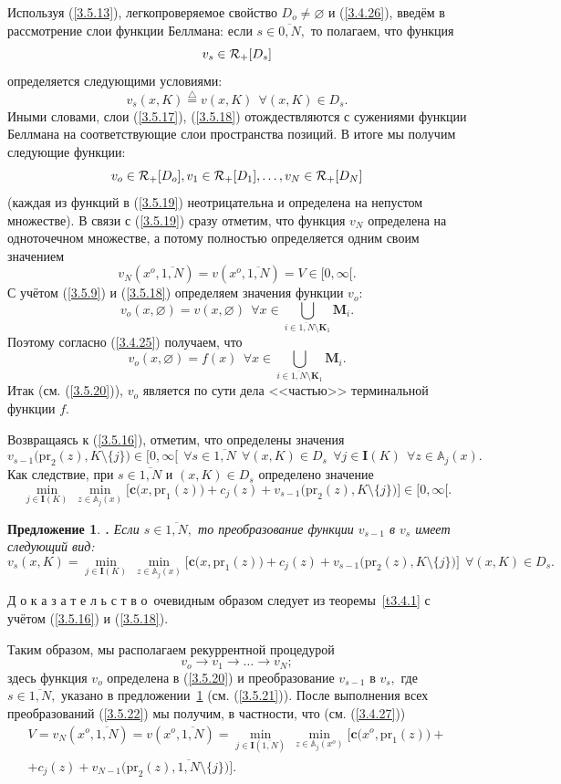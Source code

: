 \documentclass[11pt,twoside]{report}
\newcommand{\bfn}{\begin{equation}}
\newcommand{\efn}{\end{equation}}
\newcommand{\df}{\stackrel{\triangle}{=}}
\newcommand{\ov}{\overline}
\newcounter{theo}
\newcounter{pred}
\newtheorem{pred}{Предложение}[section]
\newcommand{\TL}{\mbox{\bf{$\!\!$.}}}
\newcommand{\sm}{\setminus}
\newcommand{\fa}{\forall}
\newcommand{\clr}{{\cal R}}
\newcommand{\bba}{{\mathbb A}}
\newcommand{\emp}{\varnothing}
\begin{document}
{Используя (\ref{3.5.13}), легкопроверяемое свойство $D_o\neq \emp$ и (\ref{3.4.26}), введём
в рассмотрение слои функции Беллмана: если $s\in \ov{0,N},$ то полагаем, что функция
\bfn\label{3.5.17}v_s\in \clr_+[D_s]
\efn
определяется следующими условиями:
\bfn\label{3.5.18}v_s(x,K) \df v(x,K)\ \ \fa (x,K)\in D_s.
\efn
Иными словами, слои (\ref{3.5.17}), (\ref{3.5.18}) отождествляются с сужениями  функции
Беллмана на соответствующие слои пространства позиций. В итоге мы получим следующие функции:
\bfn\label{3.5.19}v_o\in \clr_+[D_o], v_1\in \clr_+[D_1],\ldots,v_N\in \clr_+[D_N]
\efn
(каждая из функций в (\ref{3.5.19}) неотрицательна и определена на непустом множестве).
В связи с (\ref{3.5.19}) сразу отметим, что функция $v_N$ определена на одноточечном множестве,
а потому полностью определяется одним своим значением
$$
v_N(x^o,\ov{1,N})= v(x^o,\ov{1,N}) = V\in [0,\infty[.
$$
С учётом (\ref{3.5.9}) и (\ref{3.5.18}) определяем значения функции $v_o$:
$$
v_o(x,\emp) = v(x,\emp)\ \ \fa x\in \bigcup\limits_{i\in \ov{1,N}\sm \mathbf{K}_1}\mathbf{M}_i.
$$
Поэтому согласно (\ref{3.4.25}) получаем, что
\bfn\label{3.5.20}v_o(x,\emp) = f(x)\ \ \fa x\in \bigcup\limits_{i\in \ov{1,N}\sm
\mathbf{K}_1}\mathbf{M}_i.
\efn
Итак (см. (\ref{3.5.20})), $v_o$ является  по сути дела <<частью>> терминальной функции $f.$

Возвращаясь к (\ref{3.5.16}), отметим, что определены значения
$$v_{s-1}\bigl(\mathrm{pr}_2(z),K\sm\{j\}\bigl)\in [0,\infty[\ \ \fa s \in \ov{1,N}\ \ \fa
(x,K)\in D_s\ \ \fa j\in \mathbf{I}(K)\ \ \fa z\in \bba_j(x).$$
Как следствие, при $s\in \ov{1,N}$ и $(x,K)\in D_s$ определено значение
$$\min\limits_{j\in\mathbf{I}(K)}\ \min\limits_{z\in \bba_j(x)}\bigl[\mathbf{c}\bigl(x,
\mathrm{pr}_1(z)\bigl) + c_j(z) + v_{s-1}\bigl(\mathrm{pr}_2(z),K\sm\{j\}\bigl)\bigl]\in [0,\infty[.
$$
\begin{pred}\label{p3.5.1}{\TL} Если $s\in \ov{1,N},$ то преобразование функции
$v_{s-1}$ в $v_s$ имеет следующий вид:
\bfn\label{3.5.21}v_s(x,K) = \min\limits_{j\in \mathbf{I}(K)}\ \min\limits_{z\in \bba_j(x)}
\bigl[\mathbf{c}\bigl(x,\mathrm{pr}_1(z)\bigl) + c_j(z) + v_{s-1}\bigl(\mathrm{pr}_2(z),
K\sm\{j\}\bigl)\bigl]\ \ \fa (x,K) \in D_s.
\efn
\end{pred}

Д о к а з а т е л ь с т в о\, очевидным образом следует из теоремы~\ref{t3.4.1} с учётом
(\ref{3.5.16}) и (\ref{3.5.18}).

Таким образом, мы располагаем рекуррентной процедурой
\bfn\label{3.5.22}v_o \longrightarrow v_1 \longrightarrow \ldots \longrightarrow v_N;
\efn
здесь функция $v_o$ определена в (\ref{3.5.20}) и преобразование $v_{s-1}$ в $v_s,$
где $s\in \ov{1,N},$ указано в предложении~\ref{p3.5.1} (см. (\ref{3.5.21})). После
выполнения всех преобразований (\ref{3.5.22}) мы получим, в частности, что (см. (\ref{3.4.27}))
 \begin{eqnarray}
&V = v_N(x^o,\ov{1,N}) = v(x^o,\ov{1,N}) =
\min\limits_{j\in \mathbf{I}(\overline{1,N})}\
\min\limits_{z\in \bba_j(x^o)} \bigl[\mathbf{c}\bigl(x^o,\mathrm{pr}_1(z)\bigl) +
&\nonumber\\
&+c_j(z) +
v_{N-1}\bigl(\mathrm{pr}_2(z),\ov{1,N}\sm\{j\}\bigl)\bigl].
\label{3.5.23}
\end{eqnarray}

}
\end{document}
